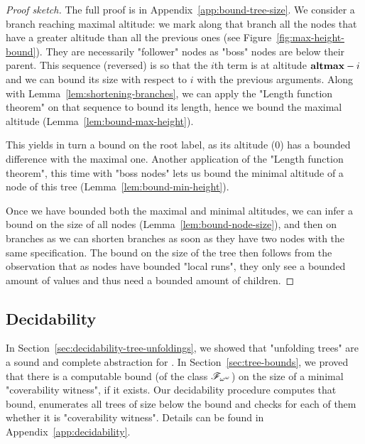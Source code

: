 \begin{proof}[Proof sketch]
	The full proof is in Appendix~\ref{app:bound-tree-size}.
	We consider a branch reaching maximal altitude: we mark along that branch all the nodes that have a greater altitude than all the previous ones (see Figure~\ref{fig:max-height-bound}). They are necessarily "follower" nodes as "boss" nodes are below their parent. This sequence (reversed) is so that the $i$th term is at altitude $\mathbf{altmax}-i$ and we can bound its size with respect to $i$ with the previous arguments. Along with Lemma~\ref{lem:shortening-branches}, we can apply the "Length function theorem" on that sequence to bound its length, hence we bound the maximal altitude (Lemma~\ref{lem:bound-max-height}).
	
	This yields in turn a bound on the root label, as its altitude ($0$) has a bounded difference with the maximal one. Another application of the "Length function theorem", this time with "boss nodes" lets us bound the minimal altitude of a node of this tree (Lemma~\ref{lem:bound-min-height}).
	
	Once we have bounded both the maximal and minimal altitudes, we can infer a bound on the size of all nodes (Lemma~\ref{lem:bound-node-size}), and then on branches as we can shorten branches as soon as they have two nodes with the same specification.
	The bound on the size of the tree then follows from the observation that as nodes have bounded "local runs", they only see a bounded amount of values and thus need a bounded amount of children.
\end{proof}


\subsection{Decidability}
\label{sec:decidability-end}

In Section~\ref{sec:decidability-tree-unfoldings}, we showed that "unfolding trees" are a sound and complete abstraction for \COVER. In Section~\ref{sec:tree-bounds}, we proved that there is a computable bound (of the class $\mathscr{F}_{\omega^\omega}$) on the size of a minimal "coverability witness", if it exists. Our decidability procedure computes that bound, enumerates all trees of size below the bound and checks for each of them whether it is "coverability witness". Details can be found in Appendix~\ref{app:decidability}.

\decidablecover*


